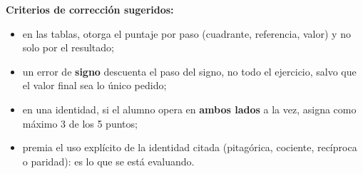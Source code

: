 \documentclass[12pt, letterpaper]{article}
\begin{document}
\begin{cuadroinfo}
  \small
  \textbf{Criterios de corrección sugeridos:}
  \begin{itemize}[leftmargin=1.2em, nosep, topsep=2pt]
    \item en las tablas, otorga el puntaje por paso (cuadrante, referencia,
          valor) y no solo por el resultado;
    \item un error de \textbf{signo} descuenta el paso del signo, no todo el
          ejercicio, salvo que el valor final sea lo único pedido;
    \item en una identidad, si el alumno opera en \textbf{ambos lados} a la
          vez, asigna como máximo 3 de los 5 puntos;
    \item premia el uso explícito de la identidad citada (pitagórica,
          cociente, recíproca o paridad): es lo que se está evaluando.
  \end{itemize}
\end{cuadroinfo}

\fi
\end{document}
